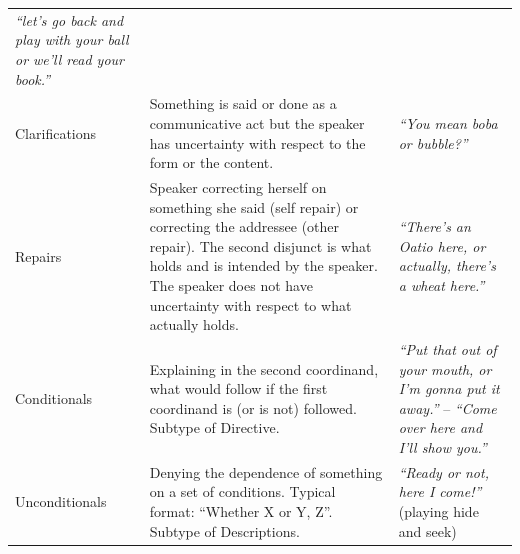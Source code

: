 \documentclass[,man,floatsintext]{apa6}
\begin{document}
\begin{longtable}[]{@{}lll@{}}
\begin{minipage}[t]{0.33\columnwidth}
\emph{\enquote{let's go back and play with your ball or we'll read your book.}}\strut
\end{minipage}\tabularnewline
\begin{minipage}[t]{0.13\columnwidth}\raggedright
Clarifications\strut
\end{minipage} & \begin{minipage}[t]{0.45\columnwidth}\raggedright
Something is said or done as a communicative act but the speaker has uncertainty with respect to the form or the content.\strut
\end{minipage} & \begin{minipage}[t]{0.33\columnwidth}\raggedright
\emph{\enquote{You mean boba or bubble?}}\strut
\end{minipage}\tabularnewline
\begin{minipage}[t]{0.13\columnwidth}\raggedright
Repairs\strut
\end{minipage} & \begin{minipage}[t]{0.45\columnwidth}\raggedright
Speaker correcting herself on something she said (self repair) or correcting the addressee (other repair). The second disjunct is what holds and is intended by the speaker. The speaker does not have uncertainty with respect to what actually holds.\strut
\end{minipage} & \begin{minipage}[t]{0.33\columnwidth}\raggedright
\emph{\enquote{There's an Oatio here, or actually, there's a wheat here.}}\strut
\end{minipage}\tabularnewline
\begin{minipage}[t]{0.13\columnwidth}\raggedright
Conditionals\strut
\end{minipage} & \begin{minipage}[t]{0.45\columnwidth}\raggedright
Explaining in the second coordinand, what would follow if the first coordinand is (or is not) followed. Subtype of Directive.\strut
\end{minipage} & \begin{minipage}[t]{0.33\columnwidth}\raggedright
\emph{\enquote{Put that out of your mouth, or I'm gonna put it away.}} -- \emph{\enquote{Come over here and I'll show you.}}\strut
\end{minipage}\tabularnewline
\begin{minipage}[t]{0.13\columnwidth}\raggedright
Unconditionals\strut
\end{minipage} & \begin{minipage}[t]{0.45\columnwidth}\raggedright
Denying the dependence of something on a set of conditions. Typical format: \enquote{Whether X or Y, Z}. Subtype of Descriptions.\strut
\end{minipage} & \begin{minipage}[t]{0.33\columnwidth}\raggedright
\emph{\enquote{Ready or not, here I come!}} (playing hide and seek)\strut
\end{minipage}\tabularnewline
\bottomrule
\end{longtable}
\end{document}
